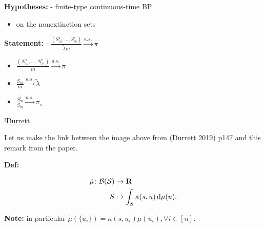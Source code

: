 \documentclass[
  letterpaper,
  DIV=11,
  numbers=noendperiod]{scrartcl}
\providecommand{\tightlist}{%
  \setlength{\itemsep}{0pt}\setlength{\parskip}{0pt}}\usepackage{longtable,booktabs,array}
\begin{document}
\textbf{Hypotheses:} - finite-type continuous-time BP

\begin{itemize}
\tightlist
\item
  on the nonextinction sets
\end{itemize}

\textbf{Statement:} -
\(\frac{(S_m^1, \dots, S_m^r)}{\tilde{\lambda} m} \xrightarrow{a.s.} \pi\)

\begin{itemize}
\item
  \(\frac{(N_m^1, \dots, N_m^r)}{m} \xrightarrow{a.s.} \pi\)
\item
  \(\frac{S_m}{m} \xrightarrow{a.s.} \tilde{\lambda}\)
\item
  \(\frac{S_m^i}{S_m} \xrightarrow{a.s.} \pi_s\)
\end{itemize}

!\href{images/durrett.jpeg}{Durrett}

Let us make the link between the image above from (Durrett 2019) p147
and this remark from the paper.

\textbf{Def:}

\[
\begin{align*}
\tilde{\mu}\colon \mathcal B(\mathcal{S}) &\rightarrow \bf R\\
S&\mapsto \int_S \kappa(s, u) \mathop{}\!\mathrm{d}\mu(u).
\end{align*}
\]

\textbf{Note:} in particular
\(\tilde{\mu}(\{u_i\}) =\kappa(s, u_i) \mu(u_i), \forall i \in [n].\)
\end{document}
